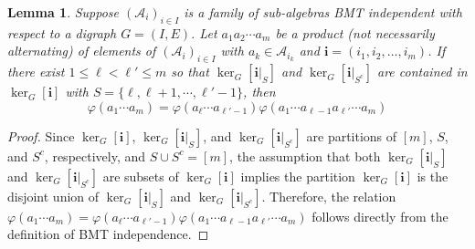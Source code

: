 \documentclass[a4paper,12pt]{extarticle}
\newtheorem{lem}[thm]{Lemma}
\theoremstyle{definition}
\theoremstyle{remark}
\begin{document}
\begin{lem}\label{lem_weak_bm}
	Suppose $(\mathcal{A}_i)_{i \in I}$ is a family of sub-algebras BMT independent with respect to a digraph $G = (I,E)$. 
	Let $a_1 a_2 \cdots a_m$ be a product (not necessarily alternating) of elements of  $(\mathcal{A}_i)_{i \in I}$ with $a_k \in \mathcal{A}_{i_k}$ and $\bm{i} = (i_1, i_2,\ldots,i_m)$. 
	If there exist $1 \leq \ell < \ell' \leq m$ so that $\ker_{G}[\bm{i}|_S]$ and $\ker_{G}[\bm{i}|_{S^c}]$ are contained in $\ker_G[\bm{i}]$ with $S = \{ \ell,\ell+1,\cdots,\ell'-1\}$, then 
	$$\varphi(a_1  \cdots a_m) = \varphi(a_{\ell} \cdots a_{\ell'-1}) \varphi(a_1\cdots a_{\ell-1} a_{\ell'} \cdots a_m)$$
\end{lem}
%
\begin{proof}
	Since $\ker_G[\bm{i}]$, $\ker_G[\bm{i}|_S]$, and $ \ker_G[\bm{i}|_{S^c}]$ are partitions of $[m]$, $S$, and $S^c$, respectively, and $S \cup S^{c} = [m]$, the assumption that both $\ker_G[\bm{i}|_S]$ and $ \ker_G[\bm{i}|_{S^c}]$ are subsets of $\ker_G[\bm{i}]$ implies the partition $\ker_G[\bm{i}]$ is the disjoint union of $ \ker_G[\bm{i}|_S]$ and $\ker_G[\bm{i}|_{S^c}]$. 
	Therefore, the relation $\varphi(a_1 \cdots a_m) = \varphi(a_{\ell} \cdots a_{\ell'-1}) \varphi(a_1\cdots a_{\ell-1} a_{\ell'} \cdots a_m)$ follows directly from the definition of BMT independence. 
\end{proof}
\end{document}
